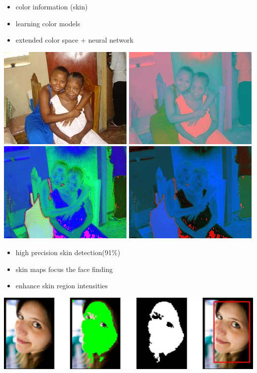 \begin{xpsectionbox}{}{}
\begin{minipage}{0.5\linewidth}
\begin{itemize}
	  \item color information (skin) 
	  \item learning color models
	  \item extended color space + neural network
\end{itemize}
\begin{center}
			\includegraphics[height=0.16\linewidth]{images/Lena_RGB}
			\includegraphics[height=0.16\linewidth]{images/Lena_LAB}
			\includegraphics[height=0.16\linewidth]{images/Lena_HSV}
			\includegraphics[height=0.16\linewidth]{images/Lena_LUV}
\end{center}

{\vspace*{0.2cm}\noindent\hspace*{0.2cm}{\bf\Titlesize Advantages}\newline}{\vspace{-0.75cm}}

\begin{itemize}
	  \item high precision skin detection(91\%)  
	  \item skin maps focus the face finding
	  \item enhance skin region intensities
\end{itemize}
\begin{center}
			
			\includegraphics[height=0.2\linewidth]{images/skin_color_demo}
\end{center}
\end{minipage}
\end{xpsectionbox}

